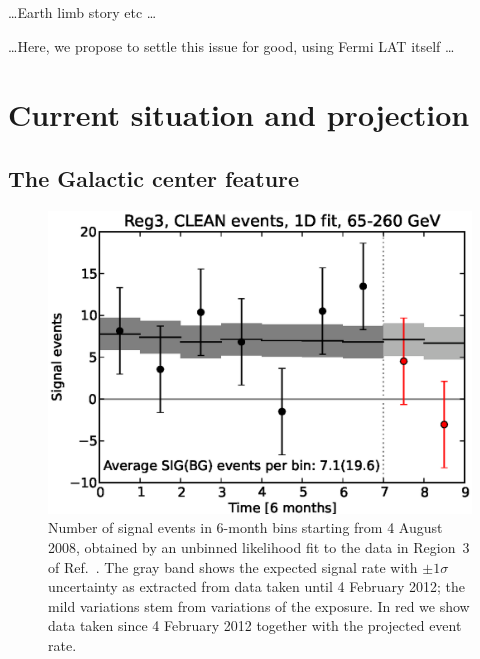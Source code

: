 \documentclass[aps,prd,superscriptaddress,showpacs,nofootinbib,fixlfloat, 12pt]{revtex4-1}
\begin{document}

\dots Earth limb story etc \dots

\dots Here, we propose to settle this issue for good, using Fermi LAT itself
\dots

\section{Current situation and projection}
\subsection{The Galactic center feature}
 
\begin{figure}[h]
  \begin{center}
    \includegraphics[width=0.60\linewidth]{plots/semester_fluxes.eps}
    \vspace{-0.5cm}
  \end{center}
  \caption{Number of signal events in 6-month bins starting from 4
    August 2008, obtained by an unbinned likelihood fit to the data in
    Region~3 of Ref.~\cite{Weniger:2012}. The gray band shows the expected
    signal rate with $\pm1\sigma$ uncertainty as extracted from data taken until
    4 February 2012; the mild variations stem from variations of the
    exposure. In red we show data taken since 4 February 2012
    together with the projected event rate.}
  \label{fig:semester_fluxes}
\end{figure}
\end{document}
